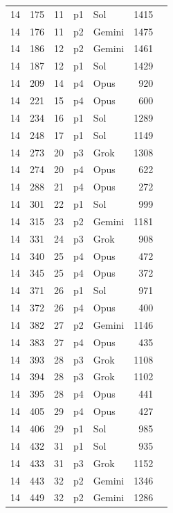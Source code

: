 \begin{longtable}{r r r l l r L{2.3in}}
14 & 175 & 11 & p1 & Sol & 1415 &  \\
14 & 176 & 11 & p2 & Gemini & 1475 &  \\
14 & 186 & 12 & p2 & Gemini & 1461 &  \\
14 & 187 & 12 & p1 & Sol & 1429 &  \\
14 & 209 & 14 & p4 & Opus & 920 &  \\
14 & 221 & 15 & p4 & Opus & 600 &  \\
14 & 234 & 16 & p1 & Sol & 1289 &  \\
14 & 248 & 17 & p1 & Sol & 1149 &  \\
14 & 273 & 20 & p3 & Grok & 1308 &  \\
14 & 274 & 20 & p4 & Opus & 622 &  \\
14 & 288 & 21 & p4 & Opus & 272 &  \\
14 & 301 & 22 & p1 & Sol & 999 &  \\
14 & 315 & 23 & p2 & Gemini & 1181 &  \\
14 & 331 & 24 & p3 & Grok & 908 &  \\
14 & 340 & 25 & p4 & Opus & 472 &  \\
14 & 345 & 25 & p4 & Opus & 372 &  \\
14 & 371 & 26 & p1 & Sol & 971 &  \\
14 & 372 & 26 & p4 & Opus & 400 &  \\
14 & 382 & 27 & p2 & Gemini & 1146 &  \\
14 & 383 & 27 & p4 & Opus & 435 &  \\
14 & 393 & 28 & p3 & Grok & 1108 &  \\
14 & 394 & 28 & p3 & Grok & 1102 &  \\
14 & 395 & 28 & p4 & Opus & 441 &  \\
14 & 405 & 29 & p4 & Opus & 427 &  \\
14 & 406 & 29 & p1 & Sol & 985 &  \\
14 & 432 & 31 & p1 & Sol & 935 &  \\
14 & 433 & 31 & p3 & Grok & 1152 &  \\
14 & 443 & 32 & p2 & Gemini & 1346 &  \\
14 & 449 & 32 & p2 & Gemini & 1286 &  \\

\end{longtable}
